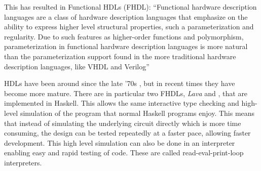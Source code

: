 		This has resulted in Functional HDLs (FHDL): ``Functional hardware
		description languages are a class of hardware description languages
		that emphasize on the ability to express higher level structural
		properties, such a parameterization and regularity. Due to such
		features as higher-order functions and polymorphism, parameterization
		in functional hardware description languages is more natural than the
		parameterization support found in the more traditional hardware
		description languages, like VHDL and Verilog'' \cite{Baaij2009}
		
		HDLs have been around since the late '70s \cite{Chen2012}, but in
		recent times they have become more mature\cite{TODO}. There are in
		particular two FHDLs, \emph{Lava} and \clash \cite{Baaij2009,
		Bjesse1998}, that are implemented in Haskell. This allows the same
		interactive type checking and high-level simulation of the program that
		normal Haskell programs enjoy. This means that instead of simulating
		the underlying circuit directly which is more time consuming, the
		design can be tested repeatedly at a faster pace, allowing faster
		development. This high level simulation can also be done in an
		interpreter enabling easy and rapid testing of code. These are called
		read-eval-print-loop interpreters.
